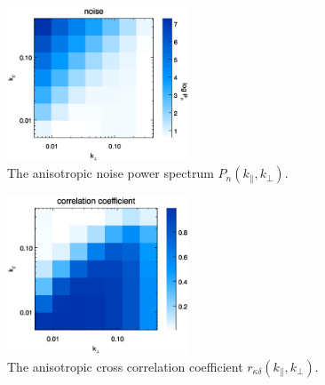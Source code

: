 \documentclass[aps,prd,twocolumn,showpacs,superscriptaddress,groupedaddress,nofootinbib]{revtex4}  %
\begin{document}
\begin{figure}[tbp]
\begin{center}
\includegraphics[width=0.48\textwidth]{f3.eps}
\end{center}
\vspace{-0.7cm}
\caption{\label{fig:noise} The anisotropic noise power spectrum $P_n(k_\parallel, k_\perp)$.
}
 \end{figure}

\begin{figure}[tbp]
\begin{center}
\includegraphics[width=0.48\textwidth]{f4.eps}
\end{center}
\vspace{-0.7cm}
\caption{\label{fig:ratio} The anisotropic cross correlation coefficient 
$r_{\kappa\delta}(k_\parallel,k_\perp)$.
}
 \end{figure}

\end{document}
